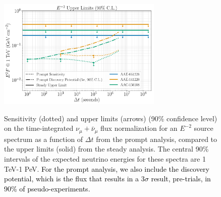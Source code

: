 \begin{figure}
\vspace{0.05in}
\centering
  \includegraphics[width=0.7\textwidth]{figures/ANITA/Transient_upper_limits.pdf}
  \label{fig:ANITA_upper_limits}
  \caption[ANITA point source upper limits]{Sensitivity (dotted) and upper limits (arrows) (90\% confidence level) on the time-integrated $\nu_{\mu} + \bar{\nu}_{\mu}$ flux normalization for an $E^{-2}$ source spectrum as a function of $\Delta t$ from the prompt analysis, compared to the upper limits (solid) from the steady analysis. The central 90\% intervals of the expected neutrino energies for these spectra are 1 TeV-1 PeV. \textcolor{black}{For the prompt analysis, we also include the discovery potential, which is the flux that results in a 3$\sigma$ result, pre-trials, in 90\% of pseudo-experiments.}}
\end{figure}

